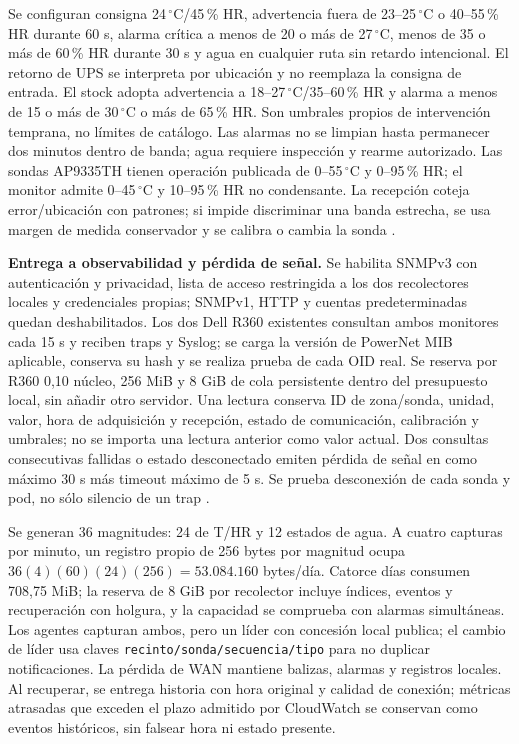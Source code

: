 Se configuran consigna 24\,$^{\circ}$C/45\,\% HR, advertencia fuera de 23--25\,$^{\circ}$C o 40--55\,\% HR durante 60 s, alarma crítica a menos de 20 o más de 27\,$^{\circ}$C, menos de 35 o más de 60\,\% HR durante 30 s y agua en cualquier ruta sin retardo intencional. El retorno de UPS se interpreta por ubicación y no reemplaza la consigna de entrada. El stock adopta advertencia a 18--27\,$^{\circ}$C/35--60\,\% HR y alarma a menos de 15 o más de 30\,$^{\circ}$C o más de 65\,\% HR. Son umbrales propios de intervención temprana, no límites de catálogo. Las alarmas no se limpian hasta permanecer dos minutos dentro de banda; agua requiere inspección y rearme autorizado. Las sondas AP9335TH tienen operación publicada de 0--55\,$^{\circ}$C y 0--95\,\% HR; el monitor admite 0--45\,$^{\circ}$C y 10--95\,\% HR no condensante. La recepción coteja error/ubicación con patrones; si impide discriminar una banda estrecha, se usa margen de medida conservador y se calibra o cambia la sonda \parencites{lote16-netbotz-th}[p.~167]{lote16-netbotz-guia}.

\textbf{Entrega a observabilidad y pérdida de señal.} Se habilita SNMPv3 con autenticación y privacidad, lista de acceso restringida a los dos recolectores locales y credenciales propias; SNMPv1, HTTP y cuentas predeterminadas quedan deshabilitados. Los dos Dell R360 existentes consultan ambos monitores cada 15 s y reciben traps y Syslog; se carga la versión de PowerNet MIB aplicable, conserva su hash y se realiza prueba de cada OID real. Se reserva por R360 0,10 núcleo, 256 MiB y 8 GiB de cola persistente dentro del presupuesto local, sin añadir otro servidor. Una lectura conserva ID de zona/sonda, unidad, valor, hora de adquisición y recepción, estado de comunicación, calibración y umbrales; no se importa una lectura anterior como valor actual. Dos consultas consecutivas fallidas o estado desconectado emiten pérdida de señal en como máximo 30 s más timeout máximo de 5 s. Se prueba desconexión de cada sonda y pod, no sólo silencio de un trap \parencites[pp.~54, 82--85]{lote16-netbotz-guia}{lote16-netbotz-mib}.

Se generan 36 magnitudes: 24 de T/HR y 12 estados de agua. A cuatro capturas por minuto, un registro propio de 256 bytes por magnitud ocupa $36(4)(60)(24)(256)=53.084.160$ bytes/día. Catorce días consumen 708,75 MiB; la reserva de 8 GiB por recolector incluye índices, eventos y recuperación con holgura, y la capacidad se comprueba con alarmas simultáneas. Los agentes capturan ambos, pero un líder con concesión local publica; el cambio de líder usa claves \texttt{recinto/sonda/secuencia/tipo} para no duplicar notificaciones. La pérdida de WAN mantiene balizas, alarmas y registros locales. Al recuperar, se entrega historia con hora original y calidad de conexión; métricas atrasadas que exceden el plazo admitido por CloudWatch se conservan como eventos históricos, sin falsear hora ni estado presente.


